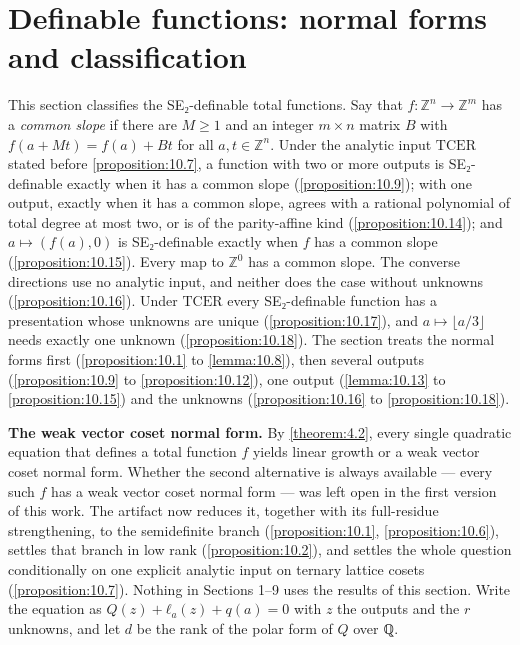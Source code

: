 \section{Definable functions: normal forms and classification}\label{sec:10}
This section classifies the SE₂-definable total functions. Say that $f : ℤ^{n} → ℤ^{m}$ has a \emph{common slope} if there are $M ≥ 1$ and an integer $m × n$ matrix $B$ with $f(a + Mt) = f(a) + Bt$ for all $a, t ∈ ℤ^{n}$. Under the analytic input $\mathrm{TCER}$ stated before \cref{proposition:10.7}, a function with two or more outputs is SE₂-definable exactly when it has a common slope (\cref{proposition:10.9}); with one output, exactly when it has a common slope, agrees with a rational polynomial of total degree at most two, or is of the parity-affine kind (\cref{proposition:10.14}); and $a ↦ (f(a), 0)$ is SE₂-definable exactly when $f$ has a common slope (\cref{proposition:10.15}). Every map to $ℤ^{0}$ has a common slope. The converse directions use no analytic input, and neither does the case without unknowns (\cref{proposition:10.16}). Under $\mathrm{TCER}$ every SE₂-definable function has a presentation whose unknowns are unique (\cref{proposition:10.17}), and $a ↦ ⌊a/3⌋$ needs exactly one unknown (\cref{proposition:10.18}). The section treats the normal forms first (\cref{proposition:10.1} to \cref{lemma:10.8}), then several outputs (\cref{proposition:10.9} to \cref{proposition:10.12}), one output (\cref{lemma:10.13} to \cref{proposition:10.15}) and the unknowns (\cref{proposition:10.16} to \cref{proposition:10.18}).

\textbf{The weak vector coset normal form.} By \cref{theorem:4.2}, every single quadratic equation that defines a total function $f$ yields linear growth or a weak vector coset normal form. Whether the second alternative is always available --- every such $f$ has a weak vector coset normal form --- was left open in the first version of this work. The artifact now reduces it, together with its full-residue strengthening, to the semidefinite branch (\cref{proposition:10.1}, \cref{proposition:10.6}), settles that branch in low rank (\cref{proposition:10.2}), and settles the whole question conditionally on one explicit analytic input on ternary lattice cosets (\cref{proposition:10.7}). Nothing in Sections 1–9 uses the results of this section. Write the equation as $Q(z) + ℓ_{a}(z) + q(a) = 0$ with $z$ the outputs and the $r$ unknowns, and let $d$ be the rank of the polar form of $Q$ over ℚ.


